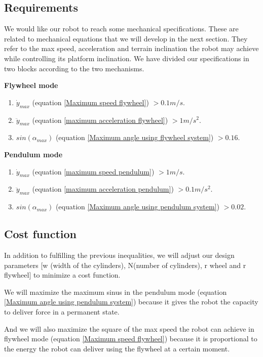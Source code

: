 \subsection{Requirements}
We would like our robot to reach some mechanical specifications. These are related to mechanical equations
that we will develop in the next section. They refer to the max speed, acceleration and terrain inclination the robot may achieve
while controlling its platform inclination. We have divided our specifications in two blocks
according to the two mechanisms.

\textbf{Flywheel mode}
\begin{enumerate}
	\item $\dot{y}_{max}$ (equation \ref{Maximum speed flywheel}) $> 0.1m/s$.
	\item $\ddot{y}_{max}$ (equation \ref{maximum acceleration flywheel}) $> 1m/s^2$.
	\item $sin(\alpha_{max})$ (equation \ref{Maximum angle using flywheel system}) $>0.16$.
\end{enumerate}

\textbf{Pendulum mode}
\begin{enumerate}
	\item $\dot{y}_{max}$ (equation \ref{maximum speed pendulum}) $>1m/s$.
	\item $\ddot{y}_{max}$ (equation \ref{maximum acceleration pendulum}) $>0.1m/s^2$.
	\item $sin(\alpha_{max})$ (equation \ref{Maximum angle using pendulum system}) $> 0.02$.
\end{enumerate}
	


\subsection{Cost function}
In addition to fulfilling the previous inequalities, we will adjust our design parameters [w (width of the
cylinders), N(number of cylinders), r wheel and r flywheel] to
minimize a cost function. 

We will maximize the maximum sinus in the pendulum mode 
(equation \ref{Maximum angle using pendulum system}) because
it gives the robot the capacity to deliver force in a permanent state.

And we will also maximize the square of the max speed the robot can achieve
in flywheel mode (equation \ref{Maximum speed flywheel}) because it is
proportional to the energy the robot can deliver using the flywheel at a certain moment.

